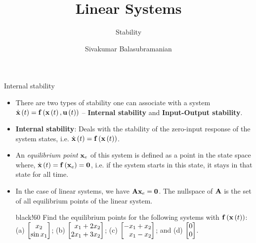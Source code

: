 \documentclass[aspectratio=169]{beamer}
\title{Linear Systems}
\subtitle{Stability}
\author{Sivakumar Balasubramanian}
\institute[Christian Medical College] %
{
  \inst{}%
  Department of Bioengineering\\
  Christian Medical College, Bagayam\\
  Vellore 632002
}
\date{}
\def\mf{\ensuremath\mathbf}
\def\lp{\ensuremath\left(}
\def\rp{\ensuremath\right)}
\def\bmx{\ensuremath\begin{bmatrix*}[r]}
\def\emx{\ensuremath\end{bmatrix*}}
\def\bmxc{\ensuremath\begin{bmatrix*}[c]}
\newcommand{\demoex}[2]{\onslide<#1->\begin{color}{black!60} #2 \end{color}}
\newcommand{\ct}[1]{\lp #1\rp}
\begin{document}

\begin{frame}
  \titlepage
\end{frame}


\begin{frame}{Internal stability}
\begin{itemize}
    \item There are two types of stability one can associate with a system $\dot{\mf{x}}\ct{t} = \mf{f}\ct{\mf{x}\ct{t}, \mf{u}\ct{t}}$ -- \textbf{Internal stability} and \textbf{Input-Output stability}.

    \item \textbf{Internal stability}: Deals with the stability of the zero-input response of the system states, i.e. $\dot{\mf{x}}\ct{t} = \mf{f}\ct{\mf{x}\ct{t}}$.

    \item An \textit{equilibrium point} $\mf{x}_e$ of this system is defined as a point in the state space where, $\dot{\mf{x}}\ct{t} = \mf{f}\ct{\mf{x}_e} = \mf{0}$, i.e. if the system starts in this state, it stays in that state for all time.

    \item In the case of linear systems, we have $\mf{A}\mf{x}_e = \mf{0}$. The nullspace of $\mf{A}$ is the set of all equilibrium points of the linear system.
    \vspace{0.2cm}

    \demoex{2}{Find the equilibrium points for the following systems with $\mf{f}\ct{\mf{x}\ct{t}}$: (a) $\bmxc x_2 \\ \sin x_1\emx$; (b) $\bmx x_1 + 2x_2\\ 2x_1 + 3x_2\emx$; (c) $\bmx -x_1 + x_2\\ x_1 - x_2\emx$; and (d) $\bmx 0 \\ 0\emx$.}
\end{itemize}
\end{frame}
\end{document}
